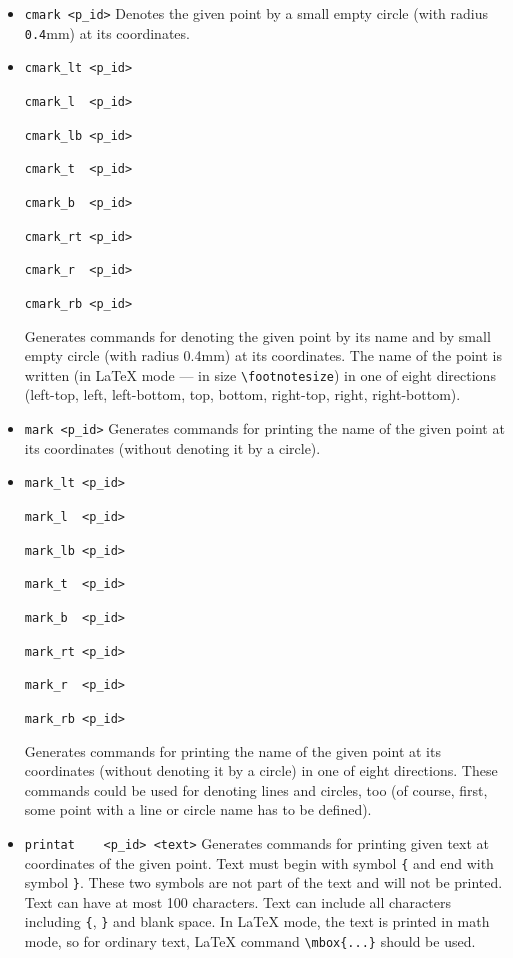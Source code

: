 \documentclass[a4paper]{book}
\begin{document}
\begin{itemize}
\item \verb|cmark <p_id>|
        Denotes the given point by a small empty circle (with
        radius \verb|0.4|mm) at its coordinates.

\item \verb|cmark_lt <p_id>|

\verb|cmark_l  <p_id>|

\verb|cmark_lb <p_id>|

\verb|cmark_t  <p_id>|

\verb|cmark_b  <p_id>|

\verb|cmark_rt <p_id>|

\verb|cmark_r  <p_id>|

\verb|cmark_rb <p_id>|

        Generates commands for denoting the given point by its name
        and by small empty circle (with radius 0.4mm) at its
        coordinates. The name of the point is written
        (in \LaTeX{} mode --- in size \verb|\footnotesize|)
        in one of eight directions (left-top, left, left-bottom, top, bottom,
        right-top, right, right-bottom).

\item \verb|mark <p_id>|
        Generates commands for printing the name of the given point at
        its coordinates (without denoting it by a circle).

\item \verb|mark_lt <p_id>|

\verb|mark_l  <p_id>|

\verb|mark_lb <p_id>|

\verb|mark_t  <p_id>|

\verb|mark_b  <p_id>|

\verb|mark_rt <p_id>|

\verb|mark_r  <p_id>|

\verb|mark_rb <p_id>|

        Generates commands for printing the name of the given point
        at its coordinates (without denoting it by a circle) in one
        of eight directions. These commands could be used for
        denoting lines and circles, too (of course, first, some
        point with a line or circle name has to be defined).

\item
\verb|printat    <p_id> <text>|
        Generates commands for printing given text at
        coordinates of the given point.
        Text must begin with symbol \verb|{| and end with symbol \verb|}|.
        These two symbols are not part of the text and will not
        be printed. Text can have at most 100 characters. Text can
        include all characters including \verb|{|, \verb|}| and blank space.
        In \LaTeX{} mode, the text is printed in math mode, so for
        ordinary text, \LaTeX{} command \verb|\mbox{...}| should be used.


\end{itemize}
\end{document}
